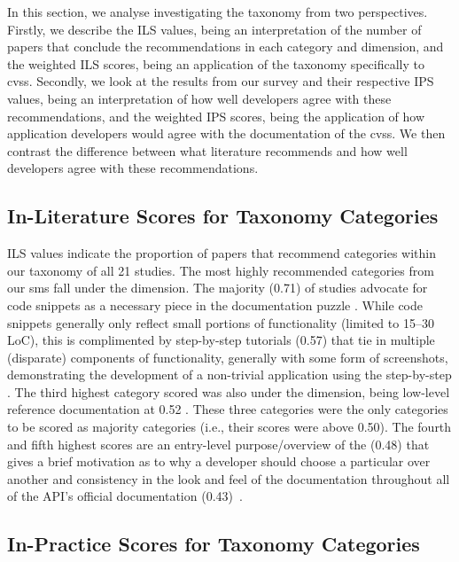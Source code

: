 In this section, we analyse investigating the taxonomy from two perspectives. Firstly, we describe the ILS values, being an interpretation of the number of papers that conclude the recommendations in each category and dimension, and the weighted ILS scores, being an application of the taxonomy specifically to \glspl{cvs}. Secondly, we look at the results from our survey and their respective IPS values, being an interpretation of how well developers agree with these recommendations, and the weighted IPS scores, being the application of how application developers would agree with the documentation of the \glspl{cvs}. We then contrast the difference between what literature recommends and how well developers agree with these recommendations.

\subsection{In-Literature Scores for Taxonomy Categories}
\label{tse2020:sec:tax-analysis:ils}

ILS values indicate the proportion of papers that recommend categories within our taxonomy of all 21 studies. The most highly recommended categories from our \gls{sms} fall under the \dima{} dimension. The majority (0.71) of studies advocate for code snippets as a necessary piece in the  documentation puzzle . While code snippets generally only reflect small portions of  functionality (limited to 15--30 LoC), this is complimented by step-by-step tutorials (0.57) that tie in multiple (disparate) components of  functionality, generally with some form of screenshots, demonstrating the development of a non-trivial application using the  step-by-step . The third highest category scored was also under the \dima{} dimension, being low-level reference documentation at 0.52 . These three categories were the only categories to be scored as majority categories (i.e., their scores were above 0.50).
The fourth and fifth highest scores are an entry-level purpose/overview of the  (0.48) that gives a brief motivation as to why a developer should choose a particular  over another  and consistency in the look and feel of the documentation throughout all of the API's official documentation (0.43)~.

\subsection{In-Practice Scores for Taxonomy Categories}
\label{tse2020:sec:tax-analysis:ips}

